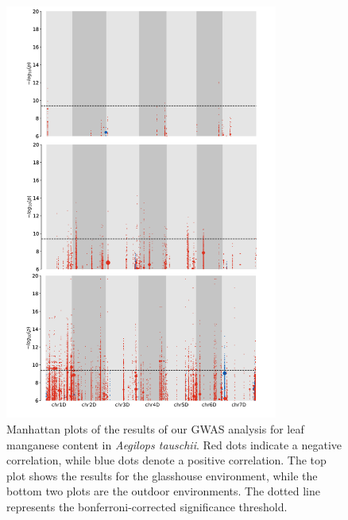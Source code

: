 \documentclass[12pt, letterpaper]{report}
\begin{document}
\begin{figure}[h]
        \centering
        \includegraphics[width = 0.8\textwidth]{images/gwas_plots/svgtopng/mn_manhattan_plot.png}
        \caption{Manhattan plots of the results of our GWAS analysis for leaf manganese content in \textit{Aegilops tauschii}. Red dots indicate a negative correlation, while blue dots denote a positive correlation. The top plot shows the results for the glasshouse environment, while the bottom two plots are the outdoor environments. The dotted line represents the bonferroni-corrected significance threshold.}
        \label{Fig:mn_peak_plot}
\end{figure}
        
\end{document}
